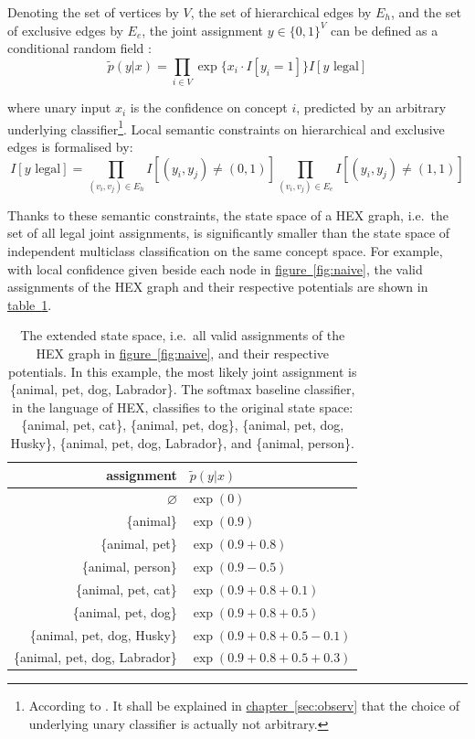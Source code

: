 \documentclass[11pt,a4paper]{book}
\begin{document}
Denoting the set of vertices by $V$, the set of hierarchical edges by $E_h$, and the set of exclusive edges by $E_e$, the joint assignment $y\in\{0,1\}^V$ can be defined as a conditional random field \cite{lafferty2001conditional}:
\begin{equation}
\tilde{p}(y|x)=\prod_{i\in V}\exp\{x_i\cdot I[y_i=1]\}I[y\text{ legal}]
\label{eqn:naive}
\end{equation}

where unary input $x_i$ is the confidence on concept $i$, predicted by an arbitrary underlying classifier\footnote{According to \cite{deng2014large}. It shall be explained in \hyperref[sec:observ]{chapter~\ref{sec:observ}} that the choice of underlying unary classifier is actually not arbitrary.}. Local semantic constraints on hierarchical and exclusive edges is formalised by:
\begin{equation}
I[y\text{ legal}]=\prod_{(v_i,v_j)\in E_h}I[(y_i,y_j)\neq(0,1)]\prod_{(v_i,v_j)\in E_e}I[(y_i,y_j)\neq(1,1)]
\label{eqn:legal}
\end{equation}

Thanks to these semantic constraints, the state space of a HEX graph, i.e.\ the set of all legal joint assignments, is significantly smaller than the state space of independent multiclass classification on the same concept space. For example, with local confidence given beside each node in \hyperref[fig:naive]{figure~\ref{fig:naive}}, the valid assignments of the HEX graph and their respective potentials are shown in \hyperref[tab:naive]{table~\ref{tab:naive}}.

\begin{table}[htbp]
\centering
\begin{tabular}{r|l}
assignment & $\tilde{p}(y|x)$\\
\hline
$\varnothing$ & $\exp(0)$\\
\{animal\} & $\exp(0.9)$\\
\{animal, pet\} & $\exp(0.9+0.8)$\\
\{animal, person\} & $\exp(0.9-0.5)$\\
\{animal, pet, cat\} & $\exp(0.9+0.8+0.1)$\\
\{animal, pet, dog\} & $\exp(0.9+0.8+0.5)$\\
\{animal, pet, dog, Husky\} & $\exp(0.9+0.8+0.5-0.1)$\\
\{animal, pet, dog, Labrador\} & $\exp(0.9+0.8+0.5+0.3)$
\end{tabular}
\caption{The extended state space, i.e.\ all valid assignments of the HEX graph in \hyperref[fig:naive]{figure~\ref{fig:naive}}, and their respective potentials. In this example, the most likely joint assignment is \{animal, pet, dog, Labrador\}. The softmax baseline classifier, in the language of HEX, classifies to the original state space: \{animal, pet, cat\}, \{animal, pet, dog\}, \{animal, pet, dog, Husky\}, \{animal, pet, dog, Labrador\}, and \{animal, person\}.}
\label{tab:naive}
\end{table}
\end{document}
